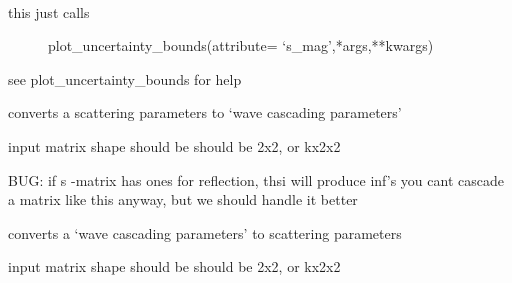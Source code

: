 \documentclass[letterpaper,10pt,english]{sphinxmanual}
\begin{document}

\begin{fulllineitems}
\label{api/mwavepy:mwavepy.network.plot_uncertainty_bounds_s_mag}~\begin{description}
\item[{this just calls }] \leavevmode
plot\_uncertainty\_bounds(attribute= `s\_mag',*args,**kwargs)

\end{description}

see plot\_uncertainty\_bounds for help

\end{fulllineitems}


\begin{fulllineitems}
\label{api/mwavepy:mwavepy.network.s2t}
converts a scattering parameters to `wave cascading parameters'

input matrix shape should be should be 2x2, or kx2x2

BUG: if s -matrix has ones for reflection, thsi will produce inf's
you cant cascade a matrix like this anyway, but we should handle it 
better

\end{fulllineitems}


\begin{fulllineitems}
\label{api/mwavepy:mwavepy.network.t2s}
converts a `wave cascading parameters' to scattering parameters

input matrix shape should be should be 2x2, or kx2x2

\end{fulllineitems}

\end{document}

